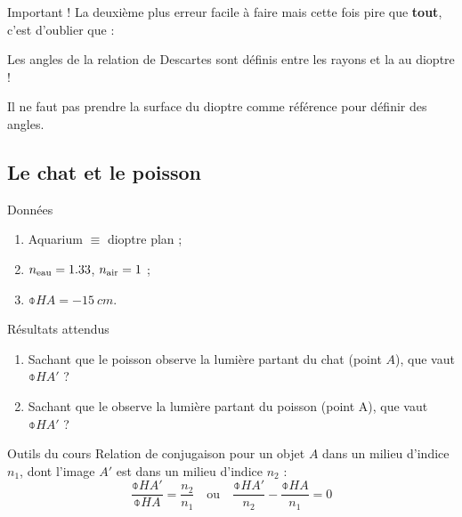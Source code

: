 \documentclass[10pt,a5paper,notitlepage]{book}
\begin{document}
\begin{bvtcb}{Important !}
    La deuxième plus  erreur facile à faire mais cette fois pire que
    \textbf{tout}, c'est d'oublier que :
    \begin{center}
        \huge Les angles de la relation de Descartes sont définis entre les
        rayons et la  au dioptre !
    \end{center}
    Il ne faut pas prendre la surface du dioptre comme référence pour définir
    des angles.
\end{bvtcb}

\subsection{Le chat et le poisson}
\begin{vtcb}{Données}
    \begin{enumerate}
        \item Aquarium $\equiv$ dioptre plan ;
        \item $n _{\text{eau}} = 1.33$, $n _{\text{air}} = 1$ ;
        \item $\obar{HA} = \SI{-15}{cm}$.
    \end{enumerate}
\end{vtcb}

\begin{rtcb}{Résultats attendus}
    \begin{enumerate}
        \item Sachant que le poisson observe la lumière partant du chat (point
            $A$), que vaut $\obar{HA'}$ ?
        \item Sachant que le  observe la lumière partant du poisson
            (point A), que vaut $\obar{HA'}$ ?
    \end{enumerate}
\end{rtcb}

\begin{btcb}{Outils du cours}
    Relation de conjugaison pour un objet $A$ dans un milieu d'indice $n_1$,
    dont l'image $A'$ est dans un milieu d'indice $n_2$ :
    \[ \frac{\obar{HA'}}{\obar{HA}} = \frac{n_2}{n_1} \quad \mathrm{ou} \quad
    \frac{\obar{HA'}}{n_2} - \frac{\obar{HA}}{n_1} = 0 \]
\end{btcb}
\end{document}
